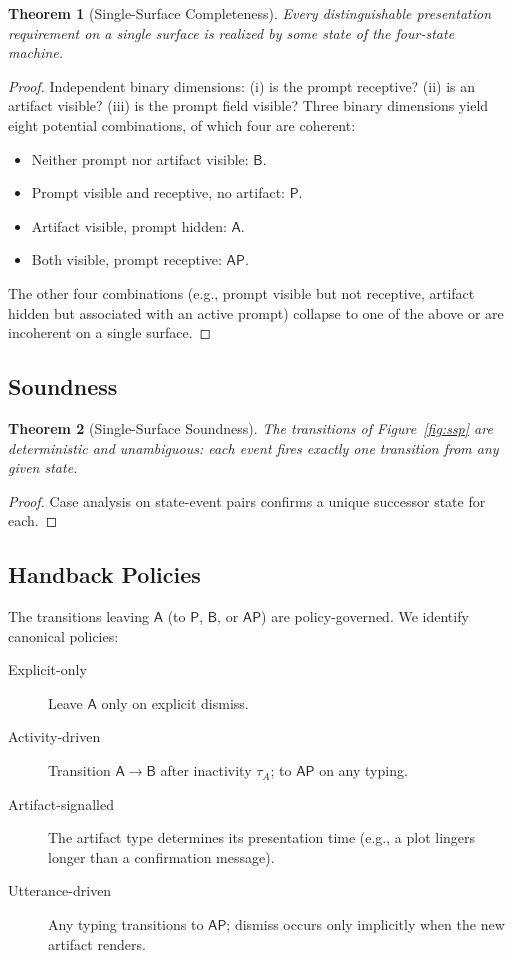 \documentclass[11pt,twocolumn,a4paper]{article}
\newtheorem{theorem}{Theorem}[section]
\theoremstyle{definition}
\theoremstyle{remark}
\begin{document}
\begin{theorem}[Single-Surface Completeness]
\label{thm:sscomplete}
Every distinguishable presentation requirement on a single surface is realized by some state of the four-state machine.
\end{theorem}

\begin{proof}
Independent binary dimensions: (i) is the prompt receptive? (ii) is an artifact visible? (iii) is the prompt field visible? Three binary dimensions yield eight potential combinations, of which four are coherent:
\begin{itemize}
    \item Neither prompt nor artifact visible: $\mathsf{B}$.
    \item Prompt visible and receptive, no artifact: $\mathsf{P}$.
    \item Artifact visible, prompt hidden: $\mathsf{A}$.
    \item Both visible, prompt receptive: $\mathsf{AP}$.
\end{itemize}
The other four combinations (e.g., prompt visible but not receptive, artifact hidden but associated with an active prompt) collapse to one of the above or are incoherent on a single surface.
\end{proof}

\subsection{Soundness}

\begin{theorem}[Single-Surface Soundness]
\label{thm:sssound}
The transitions of Figure~\ref{fig:ssp} are deterministic and unambiguous: each event fires exactly one transition from any given state.
\end{theorem}

\begin{proof}
Case analysis on state-event pairs confirms a unique successor state for each.
\end{proof}

\subsection{Handback Policies}

The transitions leaving $\mathsf{A}$ (to $\mathsf{P}$, $\mathsf{B}$, or $\mathsf{AP}$) are policy-governed. We identify canonical policies:

\begin{description}
    \item[Explicit-only] Leave $\mathsf{A}$ only on explicit dismiss.
    \item[Activity-driven] Transition $\mathsf{A} \to \mathsf{B}$ after inactivity $\tau_A$; to $\mathsf{AP}$ on any typing.
    \item[Artifact-signalled] The artifact type determines its presentation time (e.g., a plot lingers longer than a confirmation message).
    \item[Utterance-driven] Any typing transitions to $\mathsf{AP}$; dismiss occurs only implicitly when the new artifact renders.
\end{description}
\end{document}
